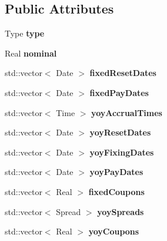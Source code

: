 \subsection*{Public Attributes}
\begin{DoxyCompactItemize}
\item 
Type {\bfseries type}\label{class_quant_lib_1_1_year_on_year_inflation_swap_1_1arguments_ae56979f17350bc0f5a85afb8dcb00a84}

\item 
Real {\bfseries nominal}\label{class_quant_lib_1_1_year_on_year_inflation_swap_1_1arguments_a5ce001a3628b0a959311705afbc71115}

\item 
std\+::vector$<$ Date $>$ {\bfseries fixed\+Reset\+Dates}\label{class_quant_lib_1_1_year_on_year_inflation_swap_1_1arguments_afdf7cbbbd740b85658048ddf25f08d07}

\item 
std\+::vector$<$ Date $>$ {\bfseries fixed\+Pay\+Dates}\label{class_quant_lib_1_1_year_on_year_inflation_swap_1_1arguments_ac36d9630d64bd9d27fe5adabcf8d1f65}

\item 
std\+::vector$<$ Time $>$ {\bfseries yoy\+Accrual\+Times}\label{class_quant_lib_1_1_year_on_year_inflation_swap_1_1arguments_a0ec1a6b5e1997a4460e8b8d5b5c527fc}

\item 
std\+::vector$<$ Date $>$ {\bfseries yoy\+Reset\+Dates}\label{class_quant_lib_1_1_year_on_year_inflation_swap_1_1arguments_a3d755e6b9432bacebb07be7eb6ab7e8d}

\item 
std\+::vector$<$ Date $>$ {\bfseries yoy\+Fixing\+Dates}\label{class_quant_lib_1_1_year_on_year_inflation_swap_1_1arguments_a7b49f26b8100c4b28564c5432a76e2d0}

\item 
std\+::vector$<$ Date $>$ {\bfseries yoy\+Pay\+Dates}\label{class_quant_lib_1_1_year_on_year_inflation_swap_1_1arguments_a9eeeb497e84dca8f398e25feca2d4ab4}

\item 
std\+::vector$<$ Real $>$ {\bfseries fixed\+Coupons}\label{class_quant_lib_1_1_year_on_year_inflation_swap_1_1arguments_a4ec430375e9a154d4b44a8953974b088}

\item 
std\+::vector$<$ Spread $>$ {\bfseries yoy\+Spreads}\label{class_quant_lib_1_1_year_on_year_inflation_swap_1_1arguments_a2b51117a79c404de01679a40118c647c}

\item 
std\+::vector$<$ Real $>$ {\bfseries yoy\+Coupons}\label{class_quant_lib_1_1_year_on_year_inflation_swap_1_1arguments_a8e5dcbd5c13ca96bf690d70285fd232e}

\end{DoxyCompactItemize}


